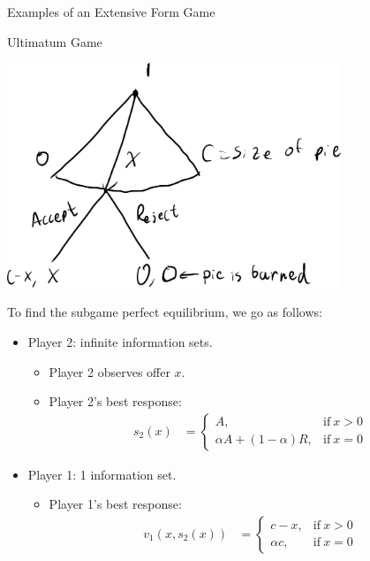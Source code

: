 \documentclass[10pt]{extarticle}
\begin{document}
  \begin{problem}{Examples of an Extensive Form Game}
    \begin{problem}{Ultimatum Game}
      \begin{center}
        \includegraphics[width=10cm]{images/ultimatum.png}
      \end{center}
      \tcblower
      To find the subgame perfect equilibrium, we go as follows:
      \begin{itemize}
        \item Player 2: infinite information sets.
          \begin{itemize}
            \item Player 2 observes offer $x$.
            \item Player 2's best response:
              \begin{align*}
                s_2(x) &= \begin{cases}
                  A,&\text{if}~x>0\\
                  \alpha A + (1-\alpha)R,&\text{if}~x=0 \tag*{$\forall \alpha\in[0,1]$}
                \end{cases}
              \end{align*}
          \end{itemize}
        \item Player 1: 1 information set.
          \begin{itemize}
            \item Player 1's best response:
              \begin{align*}
                v_1(x,s_2(x)) &= \begin{cases}
                  c-x,&\text{if}~x>0\\
                  \alpha c,&\text{if}~x=0
                \end{cases}
              \end{align*}

\end{itemize}
\end{itemize}
\end{problem}
\end{problem}
\end{document}
